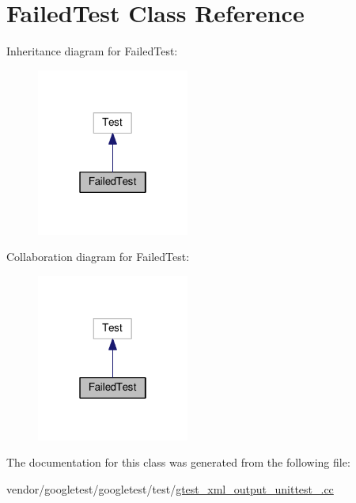 \hypertarget{classFailedTest}{}\section{Failed\+Test Class Reference}
\label{classFailedTest}


Inheritance diagram for Failed\+Test\+:
\nopagebreak
\begin{figure}[H]
\begin{center}
\leavevmode
\includegraphics[width=142pt]{classFailedTest__inherit__graph}
\end{center}
\end{figure}


Collaboration diagram for Failed\+Test\+:
\nopagebreak
\begin{figure}[H]
\begin{center}
\leavevmode
\includegraphics[width=142pt]{classFailedTest__coll__graph}
\end{center}
\end{figure}


The documentation for this class was generated from the following file\+:\begin{DoxyCompactItemize}
\item 
vendor/googletest/googletest/test/\hyperlink{gtest__xml__output__unittest___8cc}{gtest\+\_\+xml\+\_\+output\+\_\+unittest\+\_\+.\+cc}\end{DoxyCompactItemize}
